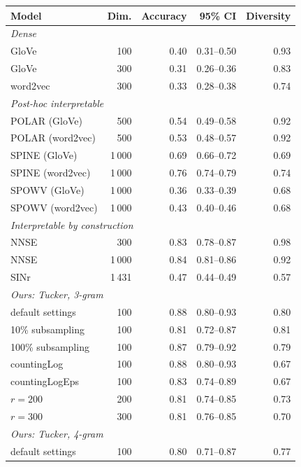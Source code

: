 \begin{table}[t]
  \centering
  \footnotesize
  \setlength{\tabcolsep}{4pt}
  \begin{tabular}{lrrrr}
    \toprule
    Model & Dim. & Accuracy & 95\% CI & Diversity \\
    \midrule
    \multicolumn{5}{l}{\textit{Dense}} \\
    GloVe & 100 & 0.40 & 0.31--0.50 & 0.93 \\
    GloVe & 300 & 0.31 & 0.26--0.36 & 0.83 \\
    word2vec & 300 & 0.33 & 0.28--0.38 & 0.74 \\
    \midrule
    \multicolumn{5}{l}{\textit{Post-hoc interpretable}} \\
    POLAR (GloVe) & 500 & 0.54 & 0.49--0.58 & 0.92 \\
    POLAR (word2vec) & 500 & 0.53 & 0.48--0.57 & 0.92 \\
    SPINE (GloVe) & 1\,000 & 0.69 & 0.66--0.72 & 0.69 \\
    SPINE (word2vec) & 1\,000 & 0.76 & 0.74--0.79 & 0.74 \\
    SPOWV (GloVe) & 1\,000 & 0.36 & 0.33--0.39 & 0.68 \\
    SPOWV (word2vec) & 1\,000 & 0.43 & 0.40--0.46 & 0.68 \\
    \midrule
    \multicolumn{5}{l}{\textit{Interpretable by construction}} \\
    NNSE & 300 & 0.83 & 0.78--0.87 & 0.98 \\
    NNSE & 1\,000 & 0.84 & 0.81--0.86 & 0.92 \\
    SINr & 1\,431 & 0.47 & 0.44--0.49 & 0.57 \\
    \midrule
    \multicolumn{5}{l}{\textit{Ours: Tucker, 3-gram}} \\
    default settings & 100 & 0.88 & 0.80--0.93 & 0.80 \\
    10\% subsampling & 100 & 0.81 & 0.72--0.87 & 0.81 \\
    100\% subsampling & 100 & 0.87 & 0.79--0.92 & 0.79 \\
    countingLog & 100 & 0.88 & 0.80--0.93 & 0.67 \\
    countingLogEps & 100 & 0.83 & 0.74--0.89 & 0.67 \\
    $r{=}200$ & 200 & 0.81 & 0.74--0.85 & 0.73 \\
    $r{=}300$ & 300 & 0.81 & 0.76--0.85 & 0.70 \\
    \midrule
    \multicolumn{5}{l}{\textit{Ours: Tucker, 4-gram}} \\
    default settings & 100 & 0.80 & 0.71--0.87 & 0.77 \\

\end{tabular}
\end{table}
